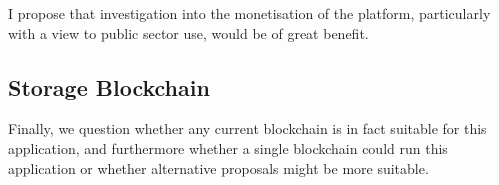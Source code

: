 I propose that investigation into the monetisation of the platform, particularly with a view to public sector use, would be of great benefit.

\subsection{Storage Blockchain}

Finally, we question whether any current blockchain is in fact suitable for this application, and furthermore whether a single blockchain could run this application or whether alternative proposals might be more suitable.
